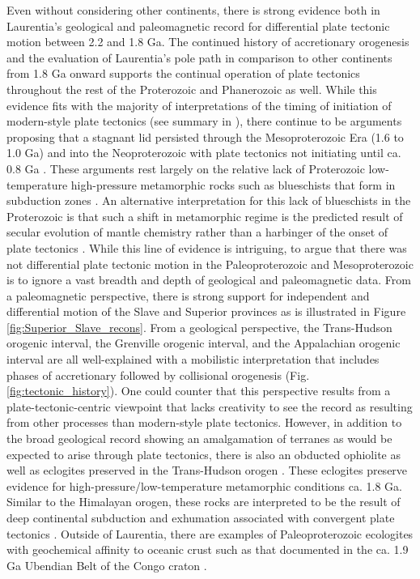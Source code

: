 \documentclass[twocolumn, switch]{article} %
\begin{document}
Even without considering other continents, there is strong evidence both in Laurentia's geological and paleomagnetic record for differential plate tectonic motion between 2.2 and 1.8 Ga. The continued history of accretionary orogenesis and the evaluation of Laurentia's pole path in comparison to other continents from 1.8 Ga onward supports the continual operation of plate tectonics throughout the rest of the Proterozoic and Phanerozoic as well. While this evidence fits with the majority of interpretations of the timing of initiation of modern-style plate tectonics (see summary in \citealp{Korenaga2013a}), there continue to be arguments proposing that a stagnant lid persisted through the Mesoproterozoic Era (1.6 to 1.0 Ga) and into the Neoproterozoic  with plate tectonics not initiating until ca. 0.8 Ga \citep{Hamilton2011a, Stern2018a}. These arguments rest largely on the relative lack of Proterozoic low-temperature high-pressure metamorphic rocks such as blueschists that form in subduction zones \citep{Stern2013a}. An alternative interpretation for this lack of blueschists in the Proterozoic is that such a shift in metamorphic regime is the predicted result of secular evolution of mantle chemistry rather than a harbinger of the onset of plate tectonics \citep{Palin2015a}. While this line of evidence is intriguing, to argue that there was not differential plate tectonic motion in the Paleoproterozoic and Mesoproterozoic is to ignore a vast breadth and depth of geological and paleomagnetic data. From a paleomagnetic perspective, there is strong support for independent and differential motion of the Slave and Superior provinces as is illustrated in Figure \ref{fig:Superior_Slave_recons}. From a geological perspective, the Trans-Hudson orogenic interval, the Grenville orogenic interval, and the Appalachian orogenic interval are all well-explained with a mobilistic interpretation that includes phases of accretionary followed by collisional orogenesis (Fig. \ref{fig:tectonic_history}). One could counter that this perspective results from a plate-tectonic-centric viewpoint that lacks creativity to see the record as resulting from other processes than modern-style plate tectonics. However, in addition to the broad geological record showing an amalgamation of terranes as would be expected to arise through plate tectonics, there is also an obducted ophiolite as well as eclogites preserved in the Trans-Hudson orogen \citep{Weller2017a}. These eclogites preserve evidence for high-pressure/low-temperature metamorphic conditions ca. 1.8 Ga. Similar to the Himalayan orogen, these rocks are interpreted to be the result of deep continental subduction and exhumation associated with convergent plate tectonics \citep{Weller2017a}. Outside of Laurentia, there are examples of Paleoproterozoic ecologites with geochemical affinity to oceanic crust such as that documented in the ca. 1.9 Ga Ubendian Belt of the Congo craton \citep{Boniface2012a}.
\end{document}
